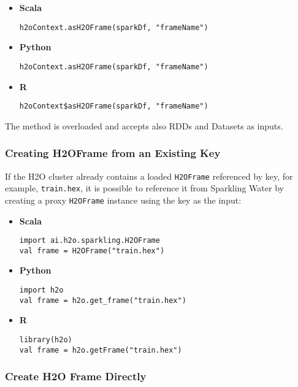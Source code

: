 \documentclass{standalone}
\begin{document}
    \begin{itemize}
        \item \textbf{Scala} \begin{lstlisting}[style=Scala]
h2oContext.asH2OFrame(sparkDf, "frameName")
        \end{lstlisting}
        \item \textbf{Python} \begin{lstlisting}[style=Python]
h2oContext.asH2OFrame(sparkDf, "frameName")
        \end{lstlisting}
        \item \textbf{R} \begin{lstlisting}[style=R]
h2oContext$asH2OFrame(sparkDf, "frameName")
        \end{lstlisting}
    \end{itemize}

    The method is overloaded and accepts also RDDs and Datasets as inputs.

    \subsubsection{Creating H2OFrame from an Existing Key}

    If the H2O cluster already contains a loaded \texttt{H2OFrame} referenced by key, for example, \texttt{train.hex}, it
    is possible to reference it from Sparkling Water by creating a proxy \texttt{H2OFrame} instance using the key as the input:

    \begin{itemize}
        \item \textbf{Scala} \begin{lstlisting}[style=Scala]
import ai.h2o.sparkling.H2OFrame
val frame = H2OFrame("train.hex")
        \end{lstlisting}
        \item \textbf{Python} \begin{lstlisting}[style=Python]
import h2o
val frame = h2o.get_frame("train.hex")
        \end{lstlisting}
        \item \textbf{R} \begin{lstlisting}[style=R]
library(h2o)
val frame = h2o.getFrame("train.hex")
        \end{lstlisting}
    \end{itemize}

    \subsubsection{Create H2O Frame Directly}
\end{document}
